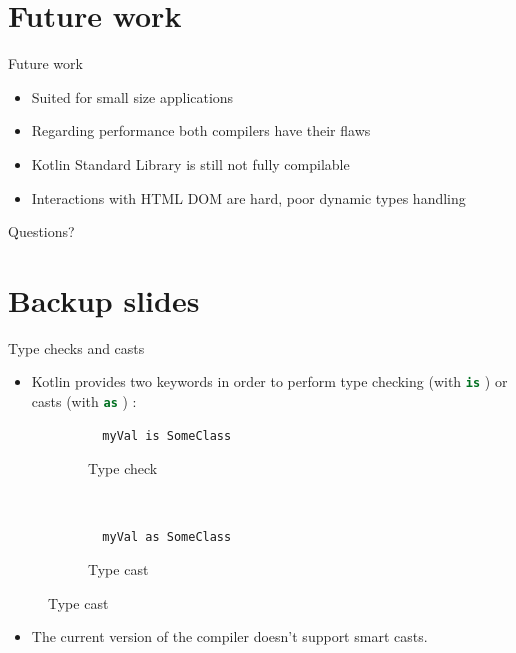 \documentclass[10pt]{beamer}
\newcommand{\inlinecode}[2]{\colorbox{minted-bg}{\lstinline[language=#1]$#2$}}
\newcommand{\ktinline}[1]{\inlinecode{kotlin}{#1}}
\begin{document}
\section{Future work}

\begin{frame}{Future work}
 \begin{itemize}
  \item Suited for small size applications
  \item Regarding performance both compilers have their flaws
  \item Kotlin Standard Library is still not fully compilable
  \item Interactions with HTML DOM are hard, poor dynamic types handling
 \end{itemize}

\end{frame}



\begin{frame}[standout]
  Questions?
\end{frame}

\appendix

\section{Backup slides}


\begin{frame}[fragile]{Type checks and casts}
 \begin{itemize}
  \item Kotlin provides two keywords in order to perform type checking (with \ktinline{is} ) or casts (with \ktinline{as} ) :
 \end{itemize}
 
  \begin{figure}
   \centering
   \begin{subfigure}[h]{0.45\textwidth}
      \begin{verbatim}
  myVal is SomeClass
      \end{verbatim}
      \caption*{Type check}
   \end{subfigure}
   ~
   \begin{subfigure}[h]{0.45\textwidth}
      \begin{verbatim}
  myVal as SomeClass
      \end{verbatim}
      \caption*{Type cast}
   \end{subfigure}

  \end{figure}
  \begin{itemize}
   \item The current version of the compiler doesn't support smart casts.
  \end{itemize}

\end{frame}
\end{document}

